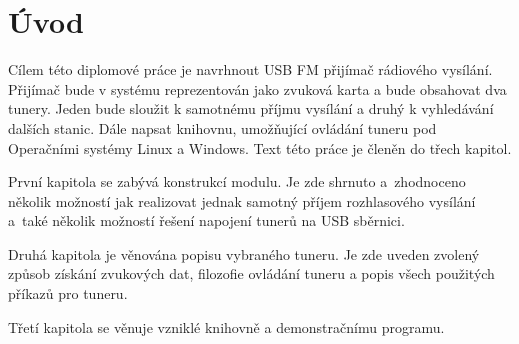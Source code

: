 \section{Úvod}
\label{sec:Uvod}

Cílem této diplomové práce je navrhnout USB FM přijímač rádiového vysílání. Přijímač bude v systému reprezentován jako zvuková karta a bude obsahovat dva tunery. Jeden bude sloužit k samotnému příjmu vysílání a druhý k vyhledávání dalších stanic. Dále napsat knihovnu, umožňující ovládání tuneru pod Operačními systémy Linux a Windows. Text této práce je členěn do třech kapitol.

První kapitola se zabývá konstrukcí modulu. Je zde shrnuto a~zhodnoceno několik možností jak realizovat jednak samotný příjem rozhlasového vysílání a~také několik možností řešení napojení tunerů na USB sběrnici.

Druhá kapitola je věnována popisu vybraného tuneru. Je zde uveden zvolený způsob získání zvukových dat, filozofie ovládání tuneru a popis všech použitých příkazů pro tuneru.

Třetí kapitola se věnuje vzniklé knihovně a demonstračnímu programu.

